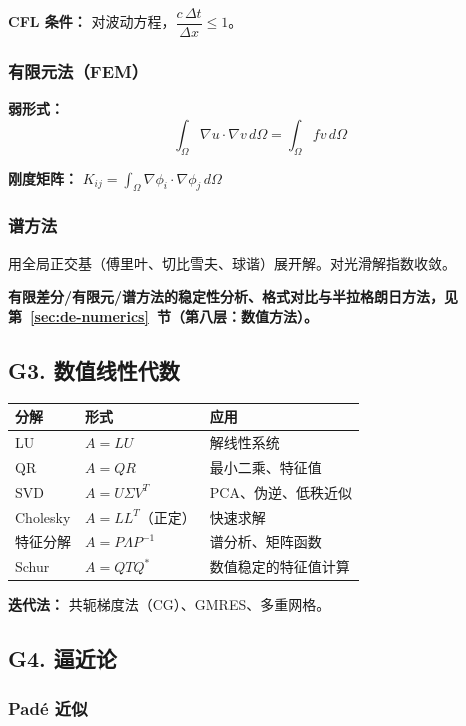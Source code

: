 \textbf{CFL 条件：} 对波动方程，$\dfrac{c\,\Delta t}{\Delta x} \leq 1$。

\subsubsection{有限元法（FEM）}

\textbf{弱形式：}
\[
\int_\Omega \nabla u \cdot \nabla v\,d\Omega = \int_\Omega fv\,d\Omega
\]

\textbf{刚度矩阵：} $K_{ij} = \displaystyle\int_\Omega \nabla\phi_i \cdot \nabla\phi_j\,d\Omega$

\subsubsection{谱方法}

用全局正交基（傅里叶、切比雪夫、球谐）展开解。对光滑解指数收敛。

\textbf{有限差分/有限元/谱方法的稳定性分析、格式对比与半拉格朗日方法，见第~\ref{sec:de-numerics}~节（第八层：数值方法）。}

\subsection{G3. 数值线性代数}

\begin{center}
\begin{tabular}{lll}
\toprule
\textbf{分解} & \textbf{形式} & \textbf{应用} \\
\midrule
LU & $A = LU$ & 解线性系统 \\
QR & $A = QR$ & 最小二乘、特征值 \\
SVD & $A = U\Sigma V^T$ & PCA、伪逆、低秩近似 \\
Cholesky & $A = LL^T$（正定） & 快速求解 \\
特征分解 & $A = P\Lambda P^{-1}$ & 谱分析、矩阵函数 \\
Schur & $A = QTQ^*$ & 数值稳定的特征值计算 \\
\bottomrule
\end{tabular}
\end{center}

\textbf{迭代法：} 共轭梯度法（CG）、GMRES、多重网格。

\subsection{G4. 逼近论}

\subsubsection{Padé 近似}

